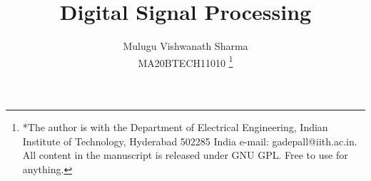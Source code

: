 \documentclass[journal,12pt,twocolumn]{IEEEtran}
\begin{document}

\def\putbox#1#2#3{\makebox[0in][l]{\makebox[#1][l]{}\raisebox{\baselineskip}[0in][0in]{\raisebox{#2}[0in][0in]{#3}}}}
     \def\rightbox#1{\makebox[0in][r]{#1}}
     \def\centbox#1{\makebox[0in]{#1}}
     \def\topbox#1{\raisebox{-\baselineskip}[0in][0in]{#1}}
     \def\midbox#1{\raisebox{-0.5\baselineskip}[0in][0in]{#1}}

\vspace{3cm}

\title{ 
Digital Signal Processing
}


%
%
%

\author{ Mulugu Vishwanath Sharma %
\\MA20BTECH11010
\thanks{*The author is with the Department
of Electrical Engineering, Indian Institute of Technology, Hyderabad
502285 India e-mail:  gadepall@iith.ac.in.  All content in the manuscript is 
released under GNU GPL.  Free to use for anything. }%
}
% 
%
\end{document}
